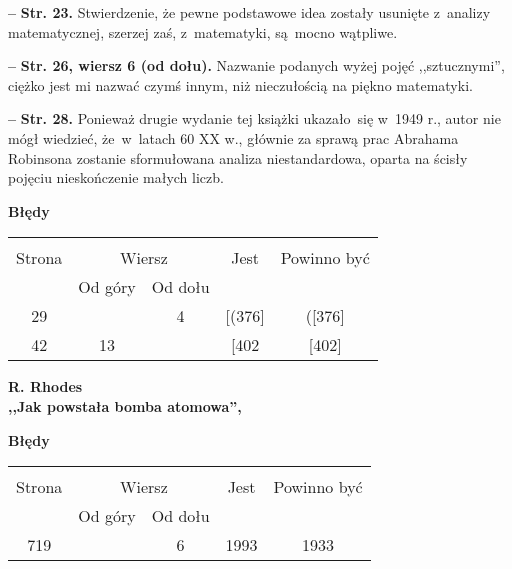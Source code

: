 \documentclass[a4paper,11pt]{article}  %
\newcommand{\spaceTwo}{2em}
\newcommand{\spaceFour}{0.5em}
\newcommand{\tb}{\textbf}
\newcommand{\noi}{\noindent}
\newcommand{\start}{\noi \tb{--} {}}
\newcommand{\Str}[1]{\tb{Str. #1.}}
\newcommand{\StrWd}[2]{\tb{Str. #1, wiersz #2 (od dołu).}}
\newcommand{\Center}[1]{\begin{center} #1 \end{center}}
\newcommand{\CenterTB}[1]{\Center{\tb{#1}}}
\newcommand{\Work}[1]{ \begin{center} {\large \tb{#1}} \end{center} }
\begin{document}
\vspace{\spaceFour}


\start \Str{23} Stwierdzenie, że pewne podstawowe idea zostały
usunięte z~analizy matematycznej, szerzej zaś, z~matematyki, są~mocno
wątpliwe.

\vspace{\spaceFour}


\start \StrWd{26}{6} Nazwanie podanych wyżej pojęć ,,sztucznymi'',
ciężko jest mi nazwać czymś innym, niż nieczułością na piękno
matematyki.

\vspace{\spaceFour}


\start \Str{28} Ponieważ drugie wydanie tej książki ukazało~się w~1949
r., autor nie mógł wiedzieć, że~w~latach 60 XX w., głównie za sprawą
prac Abrahama Robinsona zostanie sformułowana analiza niestandardowa,
oparta na ścisły pojęciu nieskończenie małych liczb.


\CenterTB{Błędy}
\begin{center}
  \begin{tabular}{|c|c|c|c|c|}
    \hline
    & \multicolumn{2}{c|}{} & & \\
    Strona & \multicolumn{2}{c|}{Wiersz}& Jest & Powinno być \\ \cline{2-3}
    & Od góry & Od dołu &  &  \\ \hline
    29 & & 4 & [(376] & ([376] \\
    42 & 13 & & [402 & [402] \\
    \hline
  \end{tabular}
\end{center}

\vspace{\spaceTwo}





\Work{
  R. Rhodes \\
  ,,Jak powstała bomba atomowa'', \cite{Rhodes00} }


\CenterTB{Błędy}
\begin{center}
  \begin{tabular}{|c|c|c|c|c|}
    \hline
    & \multicolumn{2}{c|}{} & & \\
    Strona & \multicolumn{2}{c|}{Wiersz}& Jest & Powinno być \\ \cline{2-3}
    & Od góry & Od dołu &  &  \\ \hline
    719 & &  6 & 1993 & 1933 \\
    \hline
  \end{tabular}
\end{center}
\end{document}
